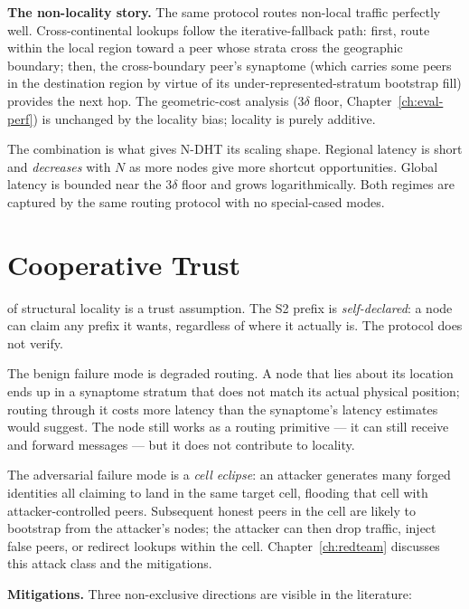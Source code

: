 \documentclass[twoside,nobib]{tufte-book}
\newcommand{\NDHT}{N-DHT\xspace}
\begin{document}
\textbf{The non-locality story.} The same protocol routes
non-local traffic perfectly well. Cross-continental lookups
follow the iterative-fallback path: first, route within the local
region toward a peer whose strata cross the geographic boundary;
then, the cross-boundary peer's synaptome (which carries some
peers in the destination region by virtue of its
under-represented-stratum bootstrap fill) provides the next hop.
The geometric-cost analysis ($3\delta$ floor,
Chapter~\ref{ch:eval-perf}) is unchanged by the locality bias;
locality is purely additive.

The combination is what gives \NDHT its scaling shape. Regional
latency is short and \emph{decreases} with $N$ as more nodes give
more shortcut opportunities. Global latency is bounded near the
$3\delta$ floor and grows logarithmically. Both regimes are
captured by the same routing protocol with no special-cased
modes.

\section{Cooperative Trust}

 of structural locality is a trust assumption.
The S2 prefix is \emph{self-declared}: a node can claim any
prefix it wants, regardless of where it actually is. The protocol
does not verify.

The benign failure mode is degraded routing. A node that lies
about its location ends up in a synaptome stratum that does not
match its actual physical position; routing through it costs more
latency than the synaptome's latency estimates would suggest. The
node still works as a routing primitive --- it can still receive
and forward messages --- but it does not contribute to locality.

The adversarial failure mode is a \emph{cell eclipse}: an attacker
generates many forged identities all claiming to land in the
same target cell, flooding that cell with attacker-controlled
peers. Subsequent honest peers in the cell are likely to bootstrap
from the attacker's nodes; the attacker can then drop traffic,
inject false peers, or redirect lookups within the cell.
Chapter~\ref{ch:redteam} discusses this attack class and the
mitigations.

\textbf{Mitigations.} Three non-exclusive directions are visible
in the literature:
\end{document}
